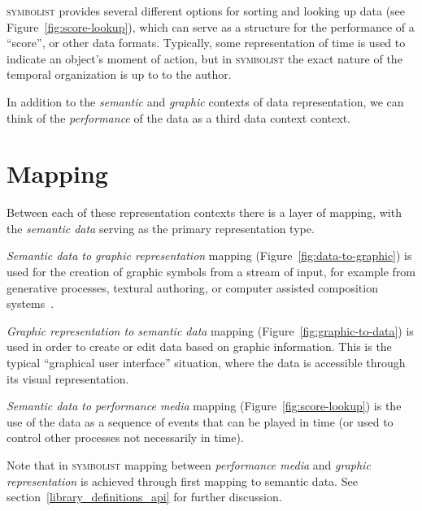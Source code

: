 \documentclass{article}
\def\symbolist{\textsc{symbolist}\xspace}
\begin{document}
\symbolist provides several different options for sorting and looking up data (see Figure~\ref{fig:score-lookup}), which can serve as a structure for the performance of a ``score'', or other data formats. Typically, some representation of time is used to indicate an object's moment of action, but in \symbolist the exact nature of the temporal organization is up to to the author.

In addition to the \textit{semantic} and \textit{graphic} contexts of data representation, we can think of the \textit{performance} of the data as a third data context context.

\section{Mapping}\label{sec:mapping}

Between each of these representation contexts there is a layer of mapping, with the \textit{semantic data} serving as the primary representation type. 

\textit{Semantic data to graphic representation} mapping (Figure~\ref{fig:data-to-graphic}) is used for the creation of graphic symbols from a stream of input, for example from generative processes, textural authoring, or computer assisted composition systems~\cite{bresson2011om, didkovsky2008maxscore, agostini2015max, baca2015abjad, burloiu2017visual}.

\textit{Graphic representation to semantic data} mapping (Figure~\ref{fig:graphic-to-data}) is used in order to create or edit data based on graphic information. This is the typical ``graphical user interface'' situation, where the data is accessible through its visual representation.

\textit{Semantic data to performance media} mapping (Figure~\ref{fig:score-lookup}) is the use of the data as a sequence of events that can be played in time (or used to control other processes not necessarily in time).

Note that in \symbolist mapping between \textit{performance media} and \textit{graphic representation} is achieved through first mapping to semantic data. See section~\ref{library_definitions_api} for further discussion.


\end{document}
